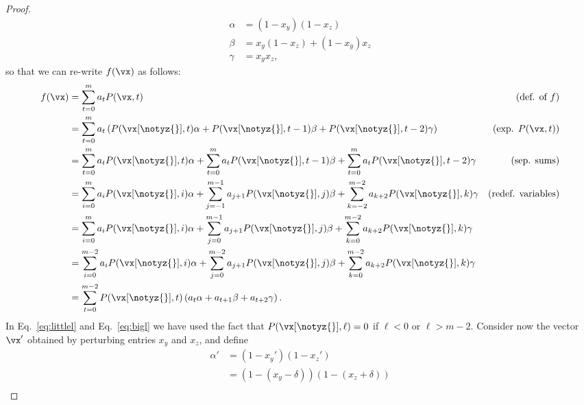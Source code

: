 \begin{proof}
	\begin{align*}
		\alpha & = (1-x_y)(1-x_z)           \\
		\beta  & = x_y (1-x_z) + (1-x_y)x_z \\
		\gamma & = x_y x_z,
	\end{align*}
	so that we can re-write $f(\vx)$ as follows:
	\begin{align}
		f(\vx) & = \sum_{t=0}^m a_t P(\vx, t)                                                                                                                                & (\text{def. of $f$}) \notag      \\
		       & = \sum_{t=0}^m a_t \left(P(\vx[\notyz{}],t)\alpha + P(\vx[\notyz{}], t-1) \beta + P(\vx[\notyz{}], t-2) \gamma  \right)                                     & (\text{exp. $P(\vx,t)$}) \notag  \\
		       & = \sum_{t=0}^m a_t P(\vx[\notyz{}],t)\alpha + \sum_{t=0}^m a_t P(\vx[\notyz{}], t-1) \beta +  \sum_{t=0}^m a_t P(\vx[\notyz{}], t-2) \gamma                 & (\text{sep. sums}) \notag        \\
		       & = \sum_{i=0}^m a_i P(\vx[\notyz{}],i)\alpha + \sum_{j=-1}^{m-1} a_{j+1} P(\vx[\notyz{}], j) \beta +  \sum_{k=-2}^{m-2} a_{k+2} P(\vx[\notyz{}], k) \gamma   & (\text{redef. variables}) \notag \\
		       & = \sum_{i=0}^m a_i P(\vx[\notyz{}],i)\alpha + \sum_{j=0}^{m-1} a_{j+1} P(\vx[\notyz{}], j) \beta +  \sum_{k=0}^{m-2} a_{k+2} P(\vx[\notyz{}], k) \gamma     & \label{eq:littlel}               \\
		       & = \sum_{i=0}^{m-2} a_i P(\vx[\notyz{}],i)\alpha + \sum_{j=0}^{m-2} a_{j+1} P(\vx[\notyz{}], j) \beta +  \sum_{k=0}^{m-2} a_{k+2} P(\vx[\notyz{}], k) \gamma & \label{eq:bigl}                  \\
		       & = \sum_{t=0}^{m-2} P(\vx[\notyz{}],t) \left( a_t \alpha +  a_{t+1}  \beta +   a_{t+2}  \gamma \right).                                                       & \label{eq:rewritef}
	\end{align}
	In Eq.~\eqref{eq:littlel} and Eq.~\eqref{eq:bigl} we have used the fact that $P(\vx[\notyz{}],\ell) = 0$ if $\ell < 0$ or $\ell > m-2$. Consider now the vector $\vx'$ obtained by perturbing entries $x_y$ and $x_z$, and define
	\begin{equation*}
		\begin{array}{llll}
			\alpha' & = (1-x_y')(1-x_z')                                               \\
			        & = (1-(x_y-\delta))(1-(x_z +\delta))                              \\

\end{array}
\end{equation*}
\end{proof}
